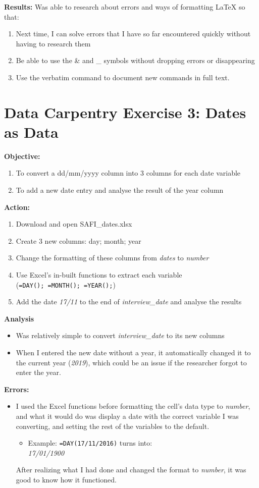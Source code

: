\documentclass{article}
\begin{document}
\textbf{Results:} Was able to research about errors and ways of formatting LaTeX so that:
\begin{enumerate}
    \item Next time, I can solve errors that I have so far encountered quickly without having to research them
    \item Be able to use the \& and \_ symbols without dropping errors or disappearing
    \item Use the verbatim command to document new commands in full text.
\end{enumerate}
\newpage
\section{Data Carpentry Exercise 3: Dates as Data}
\textbf{Objective:}
\begin{enumerate}
    \item To convert a dd/mm/yyyy column into 3 columns for each date variable
    \item To add a new date entry and analyse the result of the year column
\end{enumerate}
\textbf{Action:}
\begin{enumerate}
    \item Download and open SAFI\_dates.xlsx
    \item Create 3 new columns: day; month; year
    \item Change the formatting of these columns from \textit{dates} to \textit{number}
    \item Use Excel's in-built functions to extract each variable\\ (\verb|=DAY(); =MONTH(); =YEAR();|)
    \item Add the date \textit{17/11} to the end of \textit{interview\_date} and analyse the results
\end{enumerate}
\textbf{Analysis}
\begin{itemize}
    \item Was relatively simple to convert \textit{interview\_date} to its new columns
    \item When I entered the new date without a year, it automatically changed it to the current year (\textit{2019}), which could be an issue if the researcher forgot to enter the year.
\end{itemize}
\textbf{Errors:}
\begin{itemize}
    \item I used the Excel functions before formatting the cell's data type to \textit{number}, and what it would do was display a date with the correct variable I was converting, and setting the rest of the variables to the default.
    \begin{itemize}
        \item Example: \verb|=DAY(17/11/2016)| turns into:\\ \textit{17/01/1900}
    \end{itemize}
    After realizing what I had done and changed the format to \textit{number}, it was good to know how it functioned.
\end{itemize}
\end{document}
